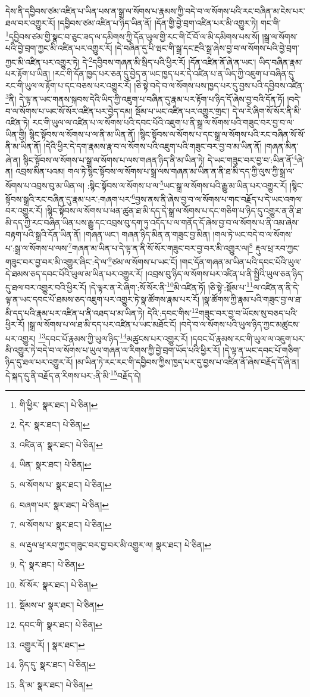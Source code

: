 དེས་ནི་དབྱིབས་ཙམ་འཛིན་པ་ཡིན་པས་ན་སྒྲ་ལ་སོགས་པ་རྣམས་ཀྱི་བདེ་བ་ལ་སོགས་པའི་རང་བཞིན་མ་ངེས་པར་ཐལ་བར་འགྱུར་རོ། །དབྱིབས་ཙམ་འཛིན་པ་ཉིད་ཡིན་ནོ། །དོན་གྱི་བྱེ་བྲག་འཛིན་པར་མི་འགྱུར་ཏེ། གང་གི་\footnote{གི་ཕྱིར་  སྣར་ཐང་།  པེ་ཅིན། }དབྱིབས་ཙམ་གྱི་སྣང་བ་ཅུང་ཟད་ལ་དམིགས་ཀྱི་དོན་ཡུལ་གྱི་རང་གི་ངོ་བོ་ལ་མི་དམིགས་པས་སོ། །སྒྲ་ལ་སོགས་པའི་བྱེ་བྲག་ཀྱང་མི་འཛིན་པར་འགྱུར་རོ། །དེ་བཞིན་དུ་པི་ཝང་གི་སྒྲ་དང་རྔའི་སྒྲ་ཞེས་བྱ་བ་ལ་སོགས་པའི་བྱེ་བྲག་ཀྱང་མི་འཛིན་པར་འགྱུར་ཏེ། དེ་\footnote{དེར་  སྣར་ཐང་།  པེ་ཅིན། }དབྱིབས་གཞན་མི་སྲིད་པའི་ཕྱིར་རོ། །དོན་འཛིན་ནོ་ཞེ་ན་ཡང་། ཡིད་བཞིན་རྣམ་པར་རྟོག་པ་ཡིན། །རང་གི་དོན་ཁྱད་པར་ཅན་དུ་བྱེད་ན་ཡང་ཁྱད་པར་དེ་འཛིན་པ་ན་ཡིད་ཀྱི་འཇུག་པ་བཞིན་དུ་རང་གི་ཡུལ་ལ་རྟོག་པ་དང་བཅས་པར་འགྱུར་རོ། །ཅི་སྟེ་བདེ་བ་ལ་སོགས་པས་ཁྱད་པར་དུ་བྱས་པའི་དབྱིབས་འཛིན་\footnote{འཛིན་ན་  སྣར་ཐང་།  པེ་ཅིན། }ནི། དེ་ལྟ་ན་ཡང་གནས་སྐབས་དེའི་ཡིད་ཀྱི་འཇུག་པ་བཞིན་དུ་རྣམ་པར་རྟོག་པ་ཉིད་དོ་ཞེས་བྱ་བའི་དོན་ཏོ། །བདེ་བ་ལ་སོགས་པ་ཡང་སོ་སོར་འཛིན་པར་བྱེད་དམ། སྡོམ་པ་ཡང་འཛིན་པར་འགྱུར་གྲང་། དེ་ལ་རེ་ཞིག་སོ་སོར་ནི་མི་འཛིན་ཏེ། རང་གི་ཡུལ་ལ་འཛིན་པ་ལ་སོགས་པའི་དབང་པོའི་འཇུག་པ་ནི་སྒྲ་ལ་སོགས་པའི་གཟུང་བར་བྱ་བ་ལ་ཡིན་གྱི། སྙིང་སྟོབས་ལ་སོགས་པ་ལ་ནི་མ་ཡིན་ནོ། །སྙིང་སྟོབས་ལ་སོགས་པ་དང་སྒྲ་ལ་སོགས་པའི་རང་བཞིན་སོ་སོ་ནི་མ་ཡིན་ནོ། །དེའི་ཕྱིར་དེ་དག་རྣམས་རྣ་བ་ལ་སོགས་པའི་འཇུག་པའི་གཟུང་བར་བྱ་བ་མ་ཡིན་ནོ། །གཞན་མིན་ཞེ་ན། སྙིང་སྟོབས་ལ་སོགས་པ་སྒྲ་ལ་སོགས་པ་ལས་གཞན་ཉིད་ནི་མ་ཡིན་ཏེ། དེ་ཡང་གཟུང་བར་བྱ་བ་:ཡིན་ནོ་\footnote{ཡིན་  སྣར་ཐང་།  པེ་ཅིན། }ཞེ་ན། འབྲས་མིན་པའམ། གལ་ཏེ་སྙིང་སྟོབས་ལ་སོགས་པ་སྒྲ་ལས་གཞན་མ་ཡིན་ན་ནི་ཐ་མི་དད་ཀྱི་ལུས་ཀྱི་སྒྲ་ལ་སོགས་པ་འབྲས་བུ་མ་ཡིན་ལ། :སྙིང་སྟོབས་ལ་སོགས་པ་ལ་\footnote{ལ་སོགས་པ་  སྣར་ཐང་།  པེ་ཅིན། }ཡང་སྒྲ་ལ་སོགས་པའི་རྒྱུ་མ་ཡིན་པར་འགྱུར་རོ། །སྙིང་སྟོབས་སྒྲའི་རང་བཞིན་དུ་རྣམ་པར་:གཞག་པར་\footnote{བཞག་པར་  སྣར་ཐང་།  པེ་ཅིན། }བྱས་ནས་ནི་ཞེས་བྱ་བ་ལ་སོགས་པ་གང་བརྗོད་པ་དེ་ཡང་འགལ་བར་འགྱུར་རོ། །སྙིང་སྟོབས་ལ་སོགས་པ་ཕན་ཚུན་ཐ་མི་དད་དེ་སྒྲ་ལ་སོགས་པ་དང་གཅིག་པ་ཉིད་དུ་འགྱུར་ན་ནི་ཐ་མི་དད་ཀྱི་རང་བཞིན་ཡིན་པས་རྒྱུ་དང་འབྲས་བུ་དག་ཏུ་འདོད་པ་ལ་གནོད་དོ་ཞེས་བྱ་བ་ལ་སོགས་པ་ནི་འམ་ཞེས་བརྟག་པའི་སྒྲའི་དོན་ཡིན་ནོ། །གཞན་ཡང་། གཞན་ཉིད་མིན་ན་གཟུང་བྱ་མིན། །གལ་ཏེ་ཡང་བདེ་བ་ལ་སོགས་པ་:སྒྲ་ལ་སོགས་པ་ལས་\footnote{ལ་སོགས་པ་  སྣར་ཐང་།  པེ་ཅིན། }གཞན་མ་ཡིན་པ་དེ་ལྟ་ན་ནི་སོ་སོར་གཟུང་བར་བྱ་བར་མི་འགྱུར་ལ།\footnote{ལ་རྡུལ་ཕྲ་རབ་ཀྱང་གཟུང་བར་བྱ་བར་མི་འགྱུར་ལ།  སྣར་ཐང་།  པེ་ཅིན། } རྡུལ་ཕྲ་རབ་ཀྱང་གཟུང་བར་བྱ་བར་མི་འགྱུར་ཞིང་:དེ་ལ་\footnote{དེ་  སྣར་ཐང་།  པེ་ཅིན། }ཙམ་ལ་སོགས་པ་ཡང་ངོ། །གང་དོན་གཞན་མ་ཡིན་པའི་དབང་པོའི་ཡུལ་དེ་ཐམས་ཅད་དབང་པོའི་ཡུལ་མ་ཡིན་པར་འགྱུར་རོ། །འབྲས་བུ་ཉིད་ལ་སོགས་པར་འཛིན་པ་ནི་སྤྱིའི་ཡུལ་ཅན་ཉིད་དུ་ཐལ་བར་འགྱུར་བའི་ཕྱིར་རོ། །དེ་ལྟར་ན་རེ་ཞིག་:སོ་སོར་ནི་\footnote{སོ་སོར་  སྣར་ཐང་།  པེ་ཅིན། }མི་འཛིན་ཏོ། །ཅི་སྟེ་:སྡོམ་པ་\footnote{སྡོམས་པ་  སྣར་ཐང་།  པེ་ཅིན། }ལ་འཛིན་ན་ནི་དེ་ལྟ་ན་ཡང་དབང་པོ་ཐམས་ཅད་འཇུག་པར་འགྱུར་ཏེ་སྣ་ཚོགས་རྣམ་པར་རོ། །སྣ་ཚོགས་ཀྱི་རྣམ་པའི་གཟུང་བྱ་ལ་ཐ་མི་དད་པའི་རྣམ་པར་འཛིན་པ་ནི་འཐད་པ་མ་ཡིན་ཏེ། དེའི་:དབང་གིས་\footnote{དབང་གི་  སྣར་ཐང་།  པེ་ཅིན། }གཟུང་བར་བྱ་བ་ཡོངས་སུ་བཅད་པའི་ཕྱིར་རོ། །སྒྲ་ལ་སོགས་པ་ལ་ཐ་མི་དད་པར་འཛིན་པ་ཡང་མཐོང་ངོ། །བདེ་བ་ལ་སོགས་པའི་ཡུལ་ཉིད་ཀྱང་མཚུངས་པར་འགྱུར། \footnote{འགྱུར་རོ། །   སྣར་ཐང་། }དབང་པོ་རྣམས་ཀྱི་ཡུལ་ཉིད་\footnote{ཉིད་དུ་  སྣར་ཐང་།  པེ་ཅིན། }མཚུངས་པར་འགྱུར་རོ། །དབང་པོ་རྣམས་རང་གི་ཡུལ་ལ་འཇུག་པར་མི་འགྱུར་ཏེ་བདེ་བ་ལ་སོགས་པ་ཡུལ་གཞན་ལ་རིགས་ཀྱི་བྱེ་བྲག་ཡོད་པའི་ཕྱིར་རོ། །དེ་ལྟ་ན་ཡང་དབང་པོ་གཅིག་ཉིད་དུ་ཐལ་པར་འགྱུར་རོ། །མ་ཡིན་ཏེ་རང་རང་གི་དབྱིབས་ཀྱིས་ཁྱད་པར་དུ་བྱས་པ་འཛིན་ནོ་ཞེས་བརྗོད་དོ་ཞེ་ན། དེ་སྐད་དུ་ནི་བརྗོད་ན་རིགས་པར་:ནི་མི་\footnote{ནི་མ་  སྣར་ཐང་།  པེ་ཅིན། }བརྗོད་དེ། 